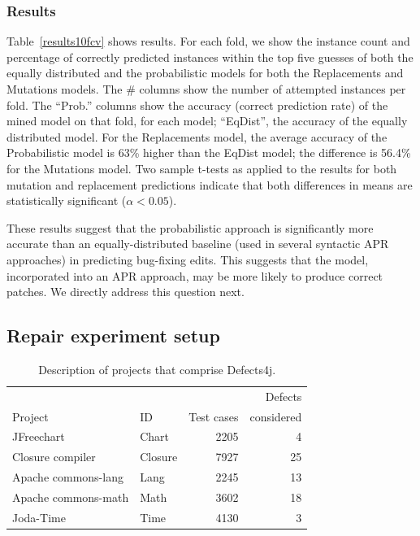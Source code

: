 \documentclass[conference]{IEEEtran}
\newcommand{\todo}[1]
  {{\scriptsize \textbf{\color{red} {#1}}}}
\begin{document}
\subsubsection{Results} 

Table~\ref{results10fcv} shows results. For each fold, we show the instance
count and percentage of correctly predicted instances within the top five
guesses of both the equally distributed and the probabilistic  models for both the
Replacements and Mutations models. The \# columns 
show the number of attempted instances per fold.  The ``Prob.'' columns show the
accuracy (correct prediction rate) of the mined model on that fold, for each model; ``EqDist'',
the accuracy of the equally distributed model.  For the Replacements model,
the average accuracy of the Probabilistic model is 63\% higher than the EqDist
model; the difference is 56.4\% for the Mutations model.
Two sample t-tests as applied to the results for both mutation and replacement
predictions indicate that both differences in means are statistically significant
($\alpha<0.05$). 

These results suggest that the probabilistic approach is
significantly more accurate than an equally-distributed baseline (used in
several syntactic APR approaches) in predicting bug-fixing edits.  This suggests
that the model, incorporated into an APR approach, may be more likely to produce
correct patches.  We directly address this question next.


\subsection{Repair experiment setup}
\label{sec:repairSetup}

\begin{table}[ht]
\centering

\begin{tabular}{llrr}
\toprule
         &     &            &  Defects\\
 Project & ID & Test cases & considered \\
\midrule
JFreechart & Chart & 2205 & 4\\
Closure compiler & Closure & 7927 & 25\\
Apache commons-lang & Lang  & 2245 & 13\\
Apache commons-math & Math & 3602 & 18\\
Joda-Time & Time & 4130 & 3\\
\bottomrule
\end{tabular}
\center
  \caption{Description of projects that comprise Defects4j. \label{defects4j}}
\end{table} 
\end{document}

